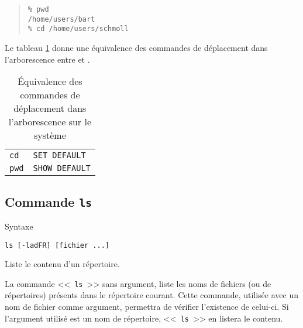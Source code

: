 \begin{example}
\begin{quote}
\begin{verbatim}
% pwd
/home/users/bart
% cd /home/users/schmoll
\end{verbatim}
\end{quote}
\end{example}

Le tableau \ref{tab-cmds-pwdcd} donne une {\'e}quivalence des commandes de
d{\'e}placement dans l'arborescence entre {\Unix} et {\OpenVMS}
.

\begin{table}[hbtp]
\centering
\begin{tabular}{|l|l|}
	\hline
	{\Unix}	&	{\OpenVMS}		\\
	\hline \hline
	{\tt cd}	&	{\tt SET DEFAULT}	\\
	\hline
	{\tt pwd}	&	{\tt SHOW DEFAULT}	\\
	\hline
\end{tabular}
\caption{\label{tab-cmds-pwdcd}\'{E}quivalence des commandes de d{\'e}placement
dans l'arborescence sur le syst{\`e}me}
\end{table}


\subsection{\label{cmds-unix-ls}Commande {\tt ls}}

\begin{definition}{Syntaxe}
\begin{verbatim}
ls [-ladFR] [fichier ...]
\end{verbatim}
Liste le contenu d'un r{\'e}pertoire.
\end{definition}

La commande <<~{\tt ls}~>> sans argument, liste les noms de fichiers (ou
de r{\'e}pertoires) pr{\'e}sents dans le r{\'e}pertoire courant. Cette commande,
utilis{\'e}e avec un nom de fichier comme argument, permettra de v{\'e}rifier
l'existence de celui-ci. Si l'argument utilis{\'e} est un nom de r{\'e}pertoire,
<<~{\tt ls}~>> en listera le contenu.


